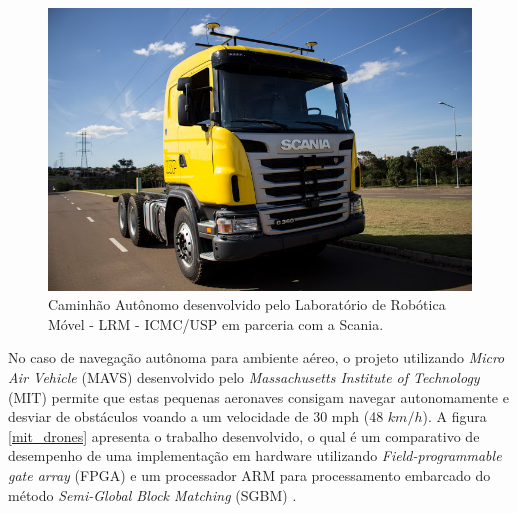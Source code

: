 \begin{figure}[H]
 	\centering
 	\includegraphics[scale=0.35]{./Resources/caminhao_autonomo.jpg}
 	\caption{Caminhão Autônomo desenvolvido pelo Laboratório de Robótica Móvel - LRM - ICMC/USP em parceria com a Scania.}
 	\label{caminhao_autonomo}
\end{figure}

No caso de navegação autônoma para ambiente aéreo, o projeto utilizando \textit{Micro Air Vehicle} (MAVS) desenvolvido pelo \textit{Massachusetts Institute of Technology} (MIT) permite que estas pequenas aeronaves consigam navegar autonomamente e desviar de obstáculos voando a um velocidade de 30 mph (48 $km/h$). A figura \ref{mit_drones} apresenta o trabalho desenvolvido, o qual é um comparativo de desempenho de uma implementação em hardware utilizando \textit{Field-programmable gate array} (FPGA) e um processador ARM para processamento embarcado do método \textit{Semi-Global Block Matching} (SGBM) \cite{BarryMIT}.

